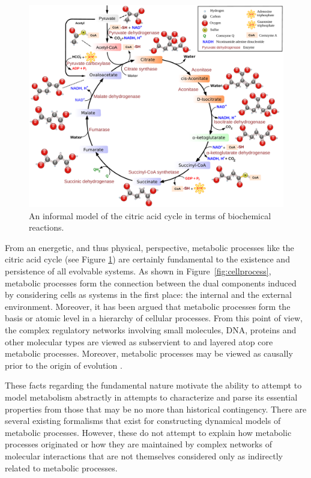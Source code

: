 \begin{figure}
\begin{center}
\noindent\includegraphics[width=0.7\columnwidth]{fig/Citric_acid_cycle.pdf}
\end{center}
\caption{An informal model of the citric acid cycle in terms of biochemical reactions.}
\label{fig:ctacyc}
\end{figure}
From an energetic, and thus physical, perspective, metabolic processes like the citric acid cycle (see Figure \ref{fig:ctacyc}) are certainly fundamental to the existence and persistence of all evolvable systems. As shown in Figure~\ref{fig:cellprocess}, metabolic processes form the connection between the dual components induced by considering cells as systems in the first place: the internal and the external environment. Moreover, it has been argued that metabolic processes form the basis or atomic level in a hierarchy of cellular processes. From this point of view, the complex regulatory networks involving small molecules, DNA, proteins and other molecular types are viewed as subservient to and layered atop core metabolic processes. Moreover, metabolic processes may be viewed as causally prior to the origin of evolution \cite{Braakman2012,Braakman2012a}.

These facts regarding the fundamental nature motivate the ability to attempt to model metabolism abstractly in attempts to characterize and parse its essential properties from those that may be no more than historical contingency. There are several existing formalisms that exist for constructing dynamical models of metabolic processes. However, these do not attempt to explain how metabolic processes originated or how they are maintained by complex networks of molecular interactions that are not themselves considered only as indirectly related to metabolic processes.

